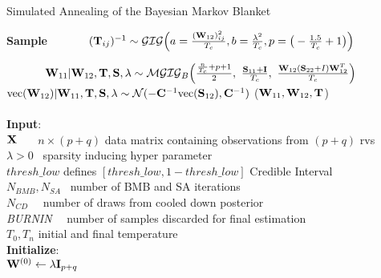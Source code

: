 \FloatBarrier
\pagebreak
\begin{algorithm}[H]
	\caption{Simulated Annealing of the Bayesian Markov Blanket}\label{alg:SA_sampler}
	
	{\fontsize{9}{12}\selectfont\begin{algorithmic}
			\State
			\textbf{Sample}		
			\State {}$\qquad\quad$
			$ 				(\mathbf{T}_{ij})^{-1} \sim \mathcal{GIG}
			\Big(
			a = \frac{(\mathbf{W}_{12})_{ij}^2}{T_{c}} ,
				b = \frac{\lambda^2}{T_{c}},
				p = \big(-\frac{1.5}{T_{c}}+1\big)
			\Big) $
			
			\State $\qquad\quad$
			$				\matr{W}_{11} | \matr{W}_{12}, \matr{T}, \matr{S}, \lambda \sim 
			\mathcal{MGIG}_B
			\Big(
			\frac{\frac{n}{\Tc}+p+1}{2}, \ 
			\frac{\Sxx+\matr{I}}{\Tc},\  
			\frac{\Wxy(\Syy+I)\Wxy^T}{\Tc}
			\Big)$
			\State $\qquad\quad$
			$ \text{vec}(\mathbf{W}_{12}) | \mathbf{W}_{11}, \mathbf{T}, \mathbf{S}, \lambda \sim \mathcal{N}(-\mathbf{C}^{-1} \text{vec}(\mathbf{S}_{12}), \mathbf{C}^{-1}) $
			\State
			\Return($\mathbf{W}_{11}, \mathbf{W}_{12}, \mathbf{T}$)
			\EndFunction
			\\
			\hrulefill
			\\
			\State \textbf{Input}: \\
			\quad\quad\quad\quad\quad
			$\mathbf{X}$ \qquad \quad\quad \ \ \  $n \times (p+q)$ data matrix containing observations from $(p+q)$ rvs
			\\
			\quad\quad\quad\quad\quad
			$\lambda>0$ \qquad \quad \ sparsity inducing hyper parameter
			\\
			\quad\quad\quad\quad\quad
			$thresh\_low$ \quad defines $[thresh\_low, 1-thresh\_low]$ Credible Interval
			\\
			\quad\quad\quad\quad\quad
			$N_{BMB}, N_{SA}$ \  number of BMB and SA iterations
			\\
			\quad\quad\quad\quad\quad
			$N_{CD}$ \qquad \quad \ \ number of draws from cooled down posterior
			\\
			\quad\quad\quad\quad\quad
			\textit{BURNIN} \quad \ \ number of samples discarded for final estimation
			\\
			\quad\quad\quad\quad\quad
			$T_0, T_n$  \qquad \quad initial and final temperature
			\\
			\State \textbf{Initialize}:\\
			\quad\quad\quad\quad\quad
			$\mathbf{W}^{(0)} \gets \lambda \mathbf{I}_{p+q}$

\end{algorithmic}}
\end{algorithm}
